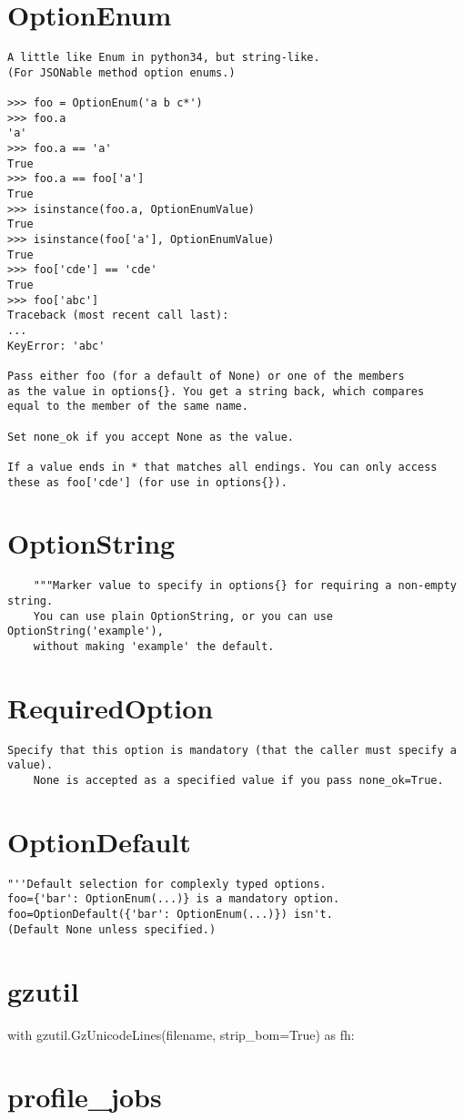 \section{OptionEnum}
\begin{verbatim}
A little like Enum in python34, but string-like.
(For JSONable method option enums.)

>>> foo = OptionEnum('a b c*')
>>> foo.a
'a'
>>> foo.a == 'a'
True
>>> foo.a == foo['a']
True
>>> isinstance(foo.a, OptionEnumValue)
True
>>> isinstance(foo['a'], OptionEnumValue)
True
>>> foo['cde'] == 'cde'
True
>>> foo['abc']
Traceback (most recent call last):
...
KeyError: 'abc'

Pass either foo (for a default of None) or one of the members
as the value in options{}. You get a string back, which compares
equal to the member of the same name.

Set none_ok if you accept None as the value.

If a value ends in * that matches all endings. You can only access
these as foo['cde'] (for use in options{}).
\end{verbatim}



\section{OptionString}
\begin{verbatim}
    """Marker value to specify in options{} for requiring a non-empty string.
    You can use plain OptionString, or you can use OptionString('example'),
    without making 'example' the default.
\end{verbatim}



\section{RequiredOption}
\begin{verbatim}
Specify that this option is mandatory (that the caller must specify a value).
    None is accepted as a specified value if you pass none_ok=True.
\end{verbatim}



\section{OptionDefault}
\begin{verbatim}
"''Default selection for complexly typed options.
foo={'bar': OptionEnum(...)} is a mandatory option.
foo=OptionDefault({'bar': OptionEnum(...)}) isn't.
(Default None unless specified.)
\end{verbatim}



\section{gzutil}
\begin{python}
with gzutil.GzUnicodeLines(filename, strip_bom=True) as fh:
\end{python}



\section{profile\_jobs}
